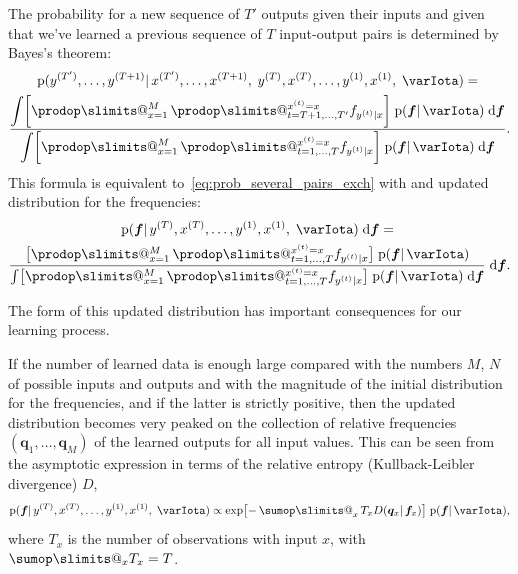 \documentclass[\ifafour a4paper,12pt,\else a5paper,10pt,\fi%
onecolumn,oneside,article,%
british%
]{memoir}
\makeatletter
\theoremstyle{remark}
\theoremstyle{innote}
\def\sum{\DOTSI\sumop\slimits@}
\def\prod{\DOTSI\prodop\slimits@}
\newcommand*{\di}{\mathrm{d}}%
\newcommand*{\pf}{\mathrm{p}}%
\renewcommand*{\|}{\mathpunct{|}}
\newcommand*{\tsum}{\mathop{\textstyle\sum}\nolimits}
\newcommand*{\yI}{\varIota}
\newcommand*{\yf}{\bm{f}}
\newcommand*{\xo}[1]{x^{(#1)}}
\newcommand*{\yo}[1]{y^{(#1)}}
\newcommand*{\yT}{T'}
\newcommand*{\yq}{\bm{q}}
\newcommand*{\yH}{D}
\makeatother
\begin{document}
The probability for a new sequence of $\yT$ outputs given their inputs and
given that we've learned a previous sequence of $T$ input-output pairs is
determined by Bayes's theorem:
\begin{equation}
  \label{eq:prob_new_several_pairs}
  \begin{gathered}
  \pf(\yo{\yT},\dotsc, \yo{T+1} \|\xo{\yT}, \dotsc, \xo{T+1},\;
  \yo{T},\xo{T},\dotsc, \yo{1},\xo{1},\; \yI) ={}\\
  \frac{\displaystyle
    \int
  \biggl[ \prod_{x=1}^M\, \prod_{t=T+1,\dotsc,\yT}^{\xo{t}=x} f_{\yo{t}\|x} \biggr]
  \;  \pf(\yf \| \yI)  \;\di\yf
}{\displaystyle
\int
  \biggl[ \prod_{x=1}^M\, \prod_{t=1,\dotsc,T}^{\xo{t}=x} f_{\yo{t}\|x} \biggr]
  \;  \pf(\yf \| \yI)  \;\di\yf
}.
\end{gathered}
\end{equation}
This formula is equivalent to~\eqref{eq:prob_several_pairs_exch} with and
updated distribution for the frequencies:
\begin{equation}
  \label{eq:update_pr_freqs}
  \begin{gathered}
  \pf(\yf \| \yo{T},\xo{T},\dotsc, \yo{1},\xo{1},\; \yI) \;\di\yf={}\\
  \frac{
  \bigl[ \prod_{x=1}^M\, \prod_{t=1,\dotsc,T}^{\xo{t}=x} f_{\yo{t}\|x} \bigr]
  \;  \pf(\yf \| \yI) 
}{
  \int  \bigl[ \prod_{x=1}^M\, \prod_{t=1,\dotsc,T}^{\xo{t}=x} f_{\yo{t}\|x} \bigr]
  \;  \pf(\yf \| \yI) \;\di\yf
  } \;\di\yf.
\end{gathered}
\end{equation}

The form of this updated distribution has important consequences for our
learning process.

If the number of learned data is enough large compared with the numbers
$M$, $N$ of possible inputs and outputs and with the magnitude of the
initial distribution for the frequencies, and if the latter is strictly
positive, then the updated distribution becomes very peaked on the
collection of relative frequencies $(\yq_1,\dotsc,\yq_M)$ of the learned
outputs for all input values. This can be seen from the asymptotic
expression in terms of the relative entropy (Kullback-Leibler divergence)
$\yH$,
  \begin{equation}
    \label{eq:asympt_pf_KL}
    \pf(\yf \| \yo{T},\xo{T},\dotsc, \yo{1},\xo{1},\; \yI)
    \propto
  \exp\bigl[ -\tsum_x T_x\yH(\yq_x \| \yf_x)  \bigr]\;
    \pf(\yf \| \yI),
  \end{equation}
where $T_x$ is the number of observations with input $x$, with $\sum_x T_x=T$.
\end{document}
